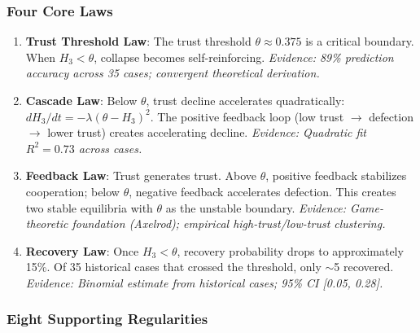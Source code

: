 \documentclass[11pt,a4paper]{article}
\newcommand{\Hthree}{H_3}
\begin{document}
\subsubsection{Four Core Laws}

\begin{enumerate}
\item \textbf{Trust Threshold Law}: The trust threshold $\theta \approx 0.375$ is a critical boundary. When $\Hthree < \theta$, collapse becomes self-reinforcing. \textit{Evidence: 89\% prediction accuracy across 35 cases; convergent theoretical derivation.}

\item \textbf{Cascade Law}: Below $\theta$, trust decline accelerates quadratically: $d\Hthree/dt = -\lambda(\theta - \Hthree)^2$. The positive feedback loop (low trust $\rightarrow$ defection $\rightarrow$ lower trust) creates accelerating decline. \textit{Evidence: Quadratic fit $R^2 = 0.73$ across cases.}

\item \textbf{Feedback Law}: Trust generates trust. Above $\theta$, positive feedback stabilizes cooperation; below $\theta$, negative feedback accelerates defection. This creates two stable equilibria with $\theta$ as the unstable boundary. \textit{Evidence: Game-theoretic foundation (Axelrod); empirical high-trust/low-trust clustering.}

\item \textbf{Recovery Law}: Once $\Hthree < \theta$, recovery probability drops to approximately 15\%. Of 35 historical cases that crossed the threshold, only $\sim$5 recovered. \textit{Evidence: Binomial estimate from historical cases; 95\% CI [0.05, 0.28].}
\end{enumerate}

\subsubsection{Eight Supporting Regularities}
\end{document}
